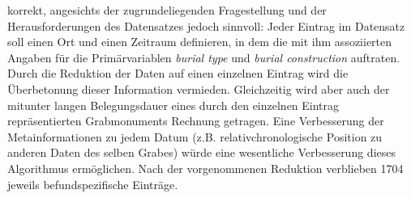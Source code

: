 \documentclass[openany,twoside,twocolumn]{book}
\begin{document}
korrekt, angesichts der zugrundeliegenden Fragestellung und der
Herausforderungen des Datensatzes jedoch sinnvoll: Jeder Eintrag im
Datensatz soll einen Ort und einen Zeitraum definieren, in dem die mit
ihm assoziierten Angaben für die Primärvariablen \emph{burial type} und
\emph{burial construction} auftraten. Durch die Reduktion der Daten auf
einen einzelnen Eintrag wird die Überbetonung dieser Information
vermieden. Gleichzeitig wird aber auch der mitunter langen
Belegungsdauer eines durch den einzelnen Eintrag repräsentierten
Grabmonuments Rechnung getragen. Eine Verbesserung der Metainformationen
zu jedem Datum (z.B. relativchronologische Position zu anderen Daten des
selben Grabes) würde eine wesentliche Verbesserung dieses Algorithmus
ermöglichen. Nach der vorgenommenen Reduktion verblieben 1704 jeweils
befundspezifische Einträge.
\end{document}
